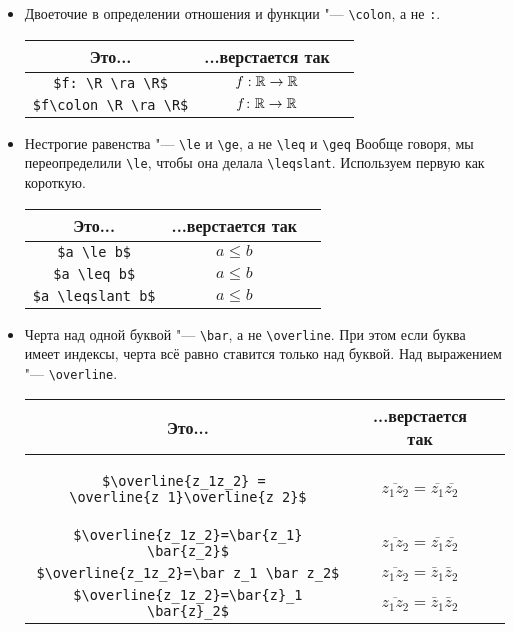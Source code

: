 \begin{enumerate}
\begin{itemize}
	\item 
		Двоеточие в определении отношения и функции "--- \verb'\colon', а не \verb':'.
		\begin{center}\begin{tabular}{|c|c|c|}
			\hline Это... & ...верстается так & \\
			\hline \verb'$f: \R \ra \R$' & $f:\mathbb{R}\rightarrow\mathbb{R}$ \bad \\
			\hline \verb'$f\colon \R \ra \R$' & $f\colon\mathbb{R}\rightarrow\mathbb{R}$ \ok \\
			\hline
		\end{tabular}\end{center}

	\item
		Нестрогие равенства "--- \verb'\le' и \verb'\ge', а не \verb'\leq' и \verb'\geq' 
		Вообще говоря, мы переопределили \verb'\le', чтобы она делала \verb'\leqslant'.
		Используем первую как короткую.
		\begin{center}\begin{tabular}{|c|c|c|}
			\hline Это... & ...верстается так & \\
			\hline \verb'$a \le b$' & $a \le b$ \ok \\
			\hline \verb'$a \leq b$' & $a \leq b$ \bad \\
			\hline \verb'$a \leqslant b$' & $a \leqslant b$ \bad \\
			\hline
		\end{tabular}\end{center}
	
	\item 
		Черта над одной буквой "--- \verb'\bar', а не \verb'\overline'.
		При этом если буква имеет индексы, черта всё равно ставится только над буквой.
		Над выражением "--- \verb'\overline'.
		\begin{center}\begin{tabular}{|c|c|c|}
			\hline Это... & ...верстается так & \\
			\hline
			\begin{minipage}{10cm}
\begin{verbatim}
$\overline{z_1z_2} = 
\overline{z_1}\overline{z_2}$
\end{verbatim}
			\end{minipage}
			& $\overline{z_1z_2} = \overline{z_1}\overline{z_2}$ \bad \\
			\hline \verb'$\overline{z_1z_2}=\bar{z_1} \bar{z_2}$' & $\overline{z_1z_2} = \bar{z_1} \bar{z_2}$ \bad \\
			\hline \verb'$\overline{z_1z_2}=\bar z_1 \bar z_2$' & $\overline{z_1z_2} = \bar z_1 \bar z_2$ \ok \\
			\hline \verb'$\overline{z_1z_2}=\bar{z}_1 \bar{z}_2$' & $\overline{z_1z_2} = \bar z_1 \bar z_2$ \ok \\
			\hline
		\end{tabular}\end{center}


\end{itemize}
\end{enumerate}
